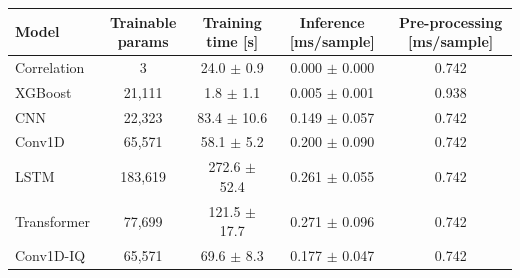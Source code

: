 \begin{tabular}{lcccc}
\toprule
Model & Trainable params & Training time [s] & Inference [ms/sample] & Pre-processing [ms/sample] \\
\midrule
Correlation & 3 & 24.0 $\pm$ 0.9 & 0.000 $\pm$ 0.000 & 0.742 \\
XGBoost & 21,111 & 1.8 $\pm$ 1.1 & 0.005 $\pm$ 0.001 & 0.938 \\
CNN & 22,323 & 83.4 $\pm$ 10.6 & 0.149 $\pm$ 0.057 & 0.742 \\
Conv1D & 65,571 & 58.1 $\pm$ 5.2 & 0.200 $\pm$ 0.090 & 0.742 \\
LSTM & 183,619 & 272.6 $\pm$ 52.4 & 0.261 $\pm$ 0.055 & 0.742 \\
Transformer & 77,699 & 121.5 $\pm$ 17.7 & 0.271 $\pm$ 0.096 & 0.742 \\
Conv1D-IQ & 65,571 & 69.6 $\pm$ 8.3 & 0.177 $\pm$ 0.047 & 0.742 \\
\bottomrule
\end{tabular}
